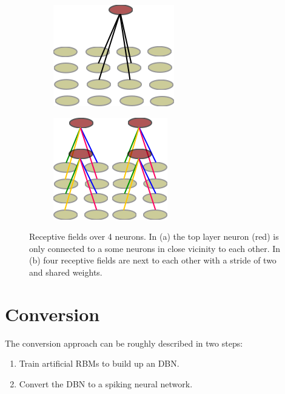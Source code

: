 \begin{figure}[h!]
	\centering
	\begin{subfigure}[t]{.4\textwidth}
  		\centering
  		\includegraphics[width=.5\linewidth]{imgs/recpt_field1.png}
  		\caption{}
  		\label{fig:receptfields1}
	\end{subfigure}%
	\begin{subfigure}[t]{.4\textwidth}
  		\centering
  		\includegraphics[width=.5\linewidth]{imgs/recpt_field2.png}
  		\caption{}
  		\label{fig:receptfields2}
	\end{subfigure}
	\caption[Receptive fields over 4 neurons.]{Receptive fields over 4 neurons. In (a) the top layer neuron (red) is only connected to a some neurons in close vicinity to each other. In (b) four receptive fields are next to each other with a stride of two and shared weights. }
	\label{fig:receptfields}
\end{figure}




\section{Conversion} \label{c:convappro}

The conversion approach can be roughly described in two steps:
\begin{enumerate}
\item Train artificial RBMs to build up an DBN.
\item Convert the DBN to a spiking neural network.
\end{enumerate}


